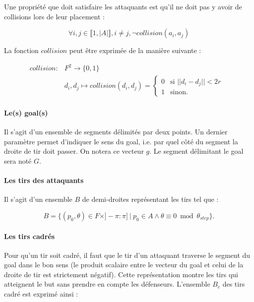 \documentclass[12pt]{article}
\begin{document}
Une propriété que doit satisfaire les attaquants est qu'il ne doit pas y avoir de collisions lors de leur placement :

\begin{equation*}
\forall i, j \in \llbracket 1, |A| \rrbracket, i \ne j, \neg collision(a_i, a_j)
\end{equation*}

La fonction $collision$ peut être exprimée de la manière suivante :

\begin{align*}
  collision \colon &F^2 \to \{0, 1 \}\\
  &d_i, d_j \mapsto collision(d_i, d_j) = \begin{cases}
                                   0 & \text{si $|| d_i - d_j || < 2r$ } \\
                                   1 & \text{sinon.}
  \end{cases}
\end{align*}

\paragraph{Le(s) goal(s)} Il s'agit d'un ensemble de segments délimités par deux points. Un dernier paramètre permet d'indiquer le sens du goal, i.e. par quel \og côté \fg{} du segment la droite de tir doit passer. On notera ce vecteur $g$. Le segment délimitant le goal sera noté $G$.

\paragraph{Les tirs des attaquants} Il s'agit d'un ensemble $B$ de demi-droites représentant les tirs tel que :

\begin{equation*}
    B = \{ (p_0, \theta) \in F \times ]-\pi: \pi] \ | \ p_0 \in A \wedge \theta \equiv 0 \bmod \theta_{step} \}.
\end{equation*}

\paragraph{Les tirs cadrés}
Pour qu'un tir soit cadré, il faut que le tir d'un attaquant traverse le segment du goal dans le bon sens (le produit scalaire entre le vecteur du goal et celui de la droite de tir est strictement négatif). Cette représentation montre les tirs qui atteignent le but sans prendre en compte les défenseurs. L'ensemble $B_c$ des tirs cadré est exprimé ainsi :
\end{document}
